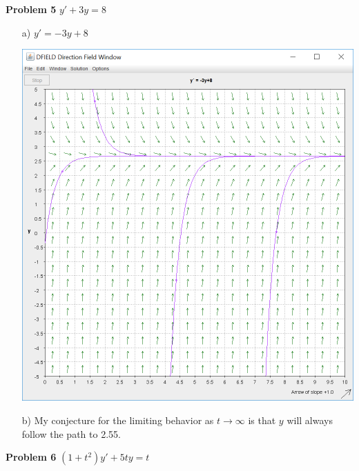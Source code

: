 \documentclass[10pt]{article}
\begin{document}
        {\bf Problem 5} $y'+3y=8$
            \begin{enumerate}
                \item[a)] $y'=-3y+8$ \begin{center}\includegraphics[scale=0.5]{lab1p3p5.PNG}\end{center}
                \item[b)] My conjecture for the limiting behavior as $t \rightarrow \infty$ is that $y$ will always follow the path to 2.55.
            \end{enumerate}
        {\bf Problem 6} $(1+t^2)y'+5ty=t$
\end{document}
